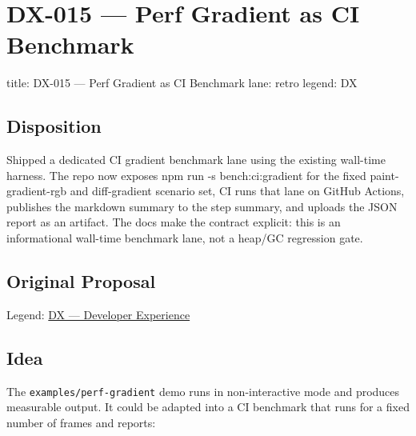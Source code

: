 \chapter{DX-015 --- Perf Gradient as CI Benchmark}\label{record-347}

\smallskip

\begin{RecordMeta}
title: DX-015 — Perf Gradient as CI Benchmark
lane: retro
legend: DX

\end{RecordMeta}

\section{Disposition}\label{record-347-disposition}

Shipped a dedicated CI gradient benchmark lane using the existing wall-time harness. The repo now exposes npm run -s bench:ci:gradient for the fixed paint-gradient-rgb and diff-gradient scenario set, CI runs that lane on GitHub Actions, publishes the markdown summary to the step summary, and uploads the JSON report as an artifact. The docs make the contract explicit: this is an informational wall-time benchmark lane, not a heap/GC regression gate.

\section{Original Proposal}\label{record-347-original-proposal}

Legend: \href{https://github.com/flyingrobots/bijou/blob/1853ad902f6bf219326409e7f743a5a1d6517dbc/docs/method/legends/DX-developer-experience.md}{DX --- Developer Experience}

\section{Idea}\label{record-347-idea}

The \texttt{e\allowbreak{}x\allowbreak{}a\allowbreak{}m\allowbreak{}p\allowbreak{}l\allowbreak{}e\allowbreak{}s\allowbreak{}/\allowbreak{}p\allowbreak{}e\allowbreak{}r\allowbreak{}f\allowbreak{}-\allowbreak{}g\allowbreak{}r\allowbreak{}a\allowbreak{}d\allowbreak{}i\allowbreak{}e\allowbreak{}n\allowbreak{}t} demo runs in non-interactive mode and produces measurable output. It could be adapted into a CI benchmark that runs for a fixed number of frames and reports:

